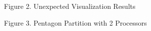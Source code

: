 \documentclass[11pt, oneside]{article}   	%
\begin{document}
\centerline {}
\centerline{Figure 2. Unexpected Visualization Results}

\vspace{2mm}

\centerline {}
\centerline{Figure 3. Pentagon Partition with 2 Processors}
\end{document}
